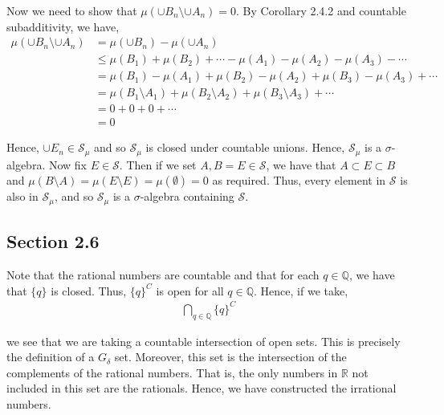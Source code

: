 \documentclass[12pt]{article}
\newenvironment{problem}[2][Problem]{\begin{trivlist}
\item[\hskip \labelsep {\bfseries #1}\hskip \labelsep {\bfseries #2.}]}{\end{trivlist}}
\begin{document}
Now we need to show that $\mu(\cup B_n \setminus \cup A_n) = 0$. By Corollary 2.4.2 and countable subadditivity, we have,
\begin{align*}
\mu(\cup B_n \setminus \cup A_n) &= \mu(\cup B_n) - \mu(\cup A_n)\\
&\leq \mu(B_1) + \mu(B_2) + \cdots - \mu(A_1) - \mu(A_2) - \mu(A_3) - \cdots\\
&= \mu(B_1) - \mu(A_1) + \mu(B_2) - \mu(A_2) + \mu(B_3) - \mu(A_3) + \cdots\\
&= \mu(B_1 \setminus A_1) + \mu(B_2 \setminus A_2) + \mu(B_3 \setminus A_3) + \cdots\\
&= 0 + 0 + 0 + \cdots\\
&= 0
\end{align*}

Hence, $\cup E_n \in \mathcal{S}_{\mu}$ and so $\mathcal{S}_{\mu}$ is closed under countable unions. Hence, $\mathcal{S}_{\mu}$ is a $\sigma$-algebra. Now fix $E \in \mathcal{S}$. Then if we set $A, B = E \in \mathcal{S}$, we have that $A \subset E \subset B$ and $\mu(B \setminus A) = \mu(E \setminus E) = \mu(\emptyset) = 0$ as required. Thus, every element in $\mathcal{S}$ is also in $\mathcal{S}_{\mu}$, and so $\mathcal{S}_{\mu}$ is a $\sigma$-algebra containing $\mathcal{S}$.

\begin{problem}{15}
\end{problem}

\subsection{Section 2.6}

\begin{problem}{2}
\end{problem}

Note that the rational numbers are countable and that for each $q \in \mathbb{Q}$, we have that $\{q\}$ is closed. Thus, $\{q\}^C$ is open for all $q \in \mathbb{Q}$. Hence, if we take,
\begin{align*}
\bigcap_{q \in \mathbb{Q}} \{q\}^C
\end{align*}

we see that we are taking a countable intersection of open sets. This is precisely the definition of a $G_{\delta}$ set. Moreover, this set is the intersection of the complements of the rational numbers. That is, the only numbers in $\mathbb{R}$ not included in this set are the rationals. Hence, we have constructed the irrational numbers.\\
\end{document}
